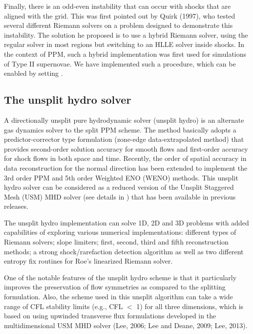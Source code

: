 Finally, there is an odd-even instability that can occur with shocks
that are aligned with the grid.  This was first pointed out by Quirk
(1997), who tested several different Riemann solvers on a problem
designed to demonstrate this instability.  The solution he proposed
is to use a hybrid Riemann solver, using the regular solver in most
regions but switching to an HLLE solver inside shocks.  In the context
of PPM, such a hybrid implementation was first used for simulations of
Type II supernovae. We have implemented such a procedure, which can be
enabled by setting  .  


\subsection{The unsplit hydro solver}
\label{Sec:MUSCL-Hancock}
\label{Sec:unsplit hydro algorithm}
A directionally unsplit pure hydrodynamic solver (unsplit hydro) is an alternate gas dynamics solver to 
the split PPM scheme.
The method basically adopts a predictor-corrector type formulation (zone-edge data-extrapolated method) that provides
second-order solution accuracy for smooth flows and first-order accuracy for shock flows in both space and time. 
Recently, the order of spatial accuracy in data reconstruction for the normal direction has been
extended to implement the 3rd order PPM and 5th order Weighted ENO (WENO) methods.
This unsplit hydro solver can be considered as a reduced version of the Unsplit Staggered Mesh (USM) MHD solver 
(see details in ) that has been
available in previous \flashx releases.

The unsplit hydro implementation can solve 1D, 2D and 3D problems with added capabilities of
exploring various numerical implementations:
different types of Riemann solvers; slope limiters; first, second, third and fifth reconstruction
methods; a strong shock/rarefaction detection algorithm %
as well as two different entropy fix routines 
for Roe's linearized Riemann solver.

One of the notable features of the unsplit hydro scheme is that it particularly improves 
the preservation of flow symmetries as compared
to the splitting formulation. Also, the scheme used in this unsplit algorithm
can take a wide range of CFL stability limits (e.g., CFL $<$ 1) for
all three dimensions, which is based on using upwinded transverse flux formulations
developed in the multidimensional USM MHD solver (Lee, 2006; Lee and Deane, 2009; Lee,  2013).


